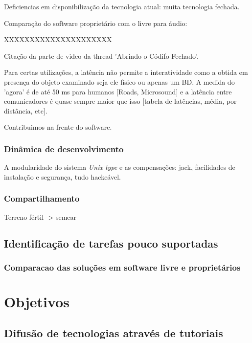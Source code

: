 Deficiencias em disponibilização da tecnologia atual: muita
tecnologia fechada.

Comparação do software proprietário com o livre para áudio:

XXXXXXXXXXXXXXXXXXXXX

Citação da parte de video da thread 'Abrindo o Códifo Fechado'.

Para certas utilizações, a latência não permite a interatividade como 
a obtida em presença do objeto examinado seja ele físico ou apenas um BD.
A medida do 'agora' é de até 50 ms para humanos [Roads, Microsound] e a latência entre comunicadores é
quase sempre maior que isso [tabela de latências, média, por distância, etc].

Contribuimos na frente do software.


\subsubsection{Dinâmica de desenvolvimento}
\label{sec:din_dev}

A modularidade do sistema \emph{Unix type} e as compensações: jack,
facilidades de instalação e segurança, tudo hackeável.

\subsubsection{Compartilhamento}
\label{sec:comp_tec}

Terreno fértil -> semear

\subsection{Identificação de tarefas pouco suportadas}
\label{sec:tarefas_n_sup}

\subsubsection{Comparacao das soluções em software livre e proprietários}
\label{sec:sl_prop}


\section{Objetivos}
\label{sec:objetivos}


\subsection{Difusão de tecnologias através de tutoriais}
\label{sec:tutoriais}

